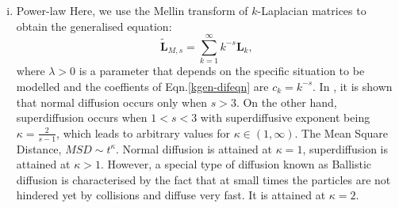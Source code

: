 \documentclass[10pt,a4paper]{article}
\begin{document}
\begin{enumerate}[i)]
    	    	\item Power-law 
    	    	Here, we use the Mellin transform of $k$-Laplacian matrices to obtain the generalised equation:
    	    	\begin{equation}
    	    	\tilde{\mathbf{L}}_{M,s} = \sum_{k=1}^{\infty} k^{-s} \mathbf{L}_k,
    	    	\label{mellin-transforms}
    	    	\end{equation}
    	    	where $\lambda >0$ is a parameter that depends on the specific situation to be modelled and the coeffients of Eqn.\ref{kgen-difeqn} are $c_{k} = k^{-s}$. 	
    	    	In \citep{estrada2017path}, it is shown that normal diffusion occurs only when $s > 3$. On the other hand, superdiffusion occurs when $1 <s < 3$ with superdiffusive exponent being $ \kappa = \frac{2}{s-1}$,
    	    	which leads to arbitrary values for $\kappa \in (1,\infty)$. 
    	    	The Mean Square Distance, $MSD \sim t^\kappa$. Normal diffusion is attained  at $\kappa =1$, superdiffusion is attained at $\kappa > 1$. However, a special type of diffusion known as Ballistic diffusion is characterised by the fact that at small times the particles are not hindered yet
    	    	by collisions and diffuse very fast. It is attained at $\kappa = 2$.
    	    \end{enumerate}
        
        \newpage
        
        
\end{document}
